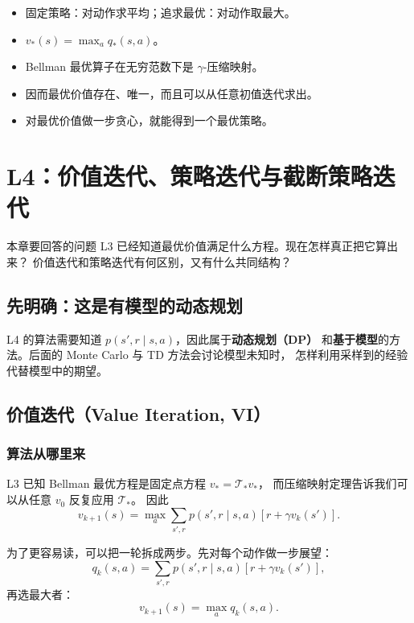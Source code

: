 \documentclass[11pt,a4paper,fontset=fandol]{ctexart}
\newcommand{\vstar}{v_*}
\newcommand{\qstar}{q_*}
\newcommand{\Tstar}{\mathcal{T}_*}
\begin{document}
\begin{memorybox}
\begin{itemize}
  \item 固定策略：对动作求平均；追求最优：对动作取最大。
  \item \(\vstar(s)=\max_a\qstar(s,a)\)。
  \item Bellman 最优算子在无穷范数下是 \(\gamma\)-压缩映射。
  \item 因而最优价值存在、唯一，而且可以从任意初值迭代求出。
  \item 对最优价值做一步贪心，就能得到一个最优策略。
\end{itemize}
\end{memorybox}

\clearpage
\section{L4：价值迭代、策略迭代与截断策略迭代}

\begin{goalbox}{本章要回答的问题}
L3 已经知道最优价值满足什么方程。现在怎样真正把它算出来？
价值迭代和策略迭代有何区别，又有什么共同结构？
\end{goalbox}

\subsection{先明确：这是有模型的动态规划}

L4 的算法需要知道 \(p(s',r\mid s,a)\)，因此属于\textbf{动态规划（DP）}
和\textbf{基于模型}的方法。后面的 Monte Carlo 与 TD 方法会讨论模型未知时，
怎样利用采样到的经验代替模型中的期望。

\subsection{价值迭代（Value Iteration, VI）}

\subsubsection{算法从哪里来}

L3 已知 Bellman 最优方程是固定点方程 \(\vstar=\Tstar\vstar\)，
而压缩映射定理告诉我们可以从任意 \(v_0\) 反复应用 \(\Tstar\)。
因此
\[
\boxed{
v_{k+1}(s)
=
\max_a
\sum_{s',r}p(s',r\mid s,a)
\left[r+\gamma v_k(s')\right]
}.
\]

为了更容易读，可以把一轮拆成两步。先对每个动作做一步展望：
\[
q_k(s,a)
=
\sum_{s',r}p(s',r\mid s,a)
\left[r+\gamma v_k(s')\right],
\]
再选最大者：
\[
v_{k+1}(s)=\max_a q_k(s,a).
\]
\end{document}
